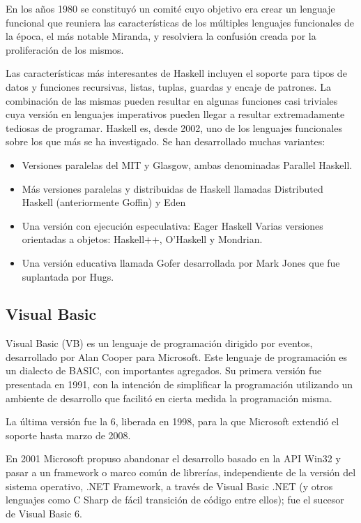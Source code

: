 \documentclass[twoside,twocolumn]{article}
\begin{document}
En los años 1980 se constituyó un comité cuyo objetivo era crear un lenguaje funcional que reuniera las características de los múltiples lenguajes funcionales de la época, el más notable Miranda, y resolviera la confusión creada por la proliferación de los mismos.

Las características más interesantes de Haskell incluyen el soporte para tipos de datos y funciones recursivas, listas, tuplas, guardas y encaje de patrones. La combinación de las mismas pueden resultar en algunas funciones casi triviales cuya versión en lenguajes imperativos pueden llegar a resultar extremadamente tediosas de programar. Haskell es, desde 2002, uno de los lenguajes funcionales sobre los que más se ha investigado. Se han desarrollado muchas variantes:
\begin{itemize}

\item Versiones paralelas del MIT y Glasgow, ambas denominadas Parallel Haskell.
\item Más versiones paralelas y distribuidas de Haskell llamadas Distributed Haskell (anteriormente Goffin) y Eden
\item   Una versión con ejecución especulativa: Eager Haskell
    Varias versiones orientadas a objetos: Haskell++, O'Haskell y Mondrian.
\item Una versión educativa llamada Gofer desarrollada por Mark Jones que fue suplantada por Hugs.
    
\end{itemize}

\subsection{Visual Basic}

Visual Basic (VB) es un lenguaje de programación dirigido por eventos, desarrollado por Alan Cooper para Microsoft. Este lenguaje de programación es un dialecto de BASIC, con importantes agregados. Su primera versión fue presentada en 1991, con la intención de simplificar la programación utilizando un ambiente de desarrollo que facilitó en cierta medida la programación misma.

La última versión fue la 6, liberada en 1998, para la que Microsoft extendió el soporte hasta marzo de 2008.

En 2001 Microsoft propuso abandonar el desarrollo basado en la API Win32 y pasar a un framework o marco común de librerías, independiente de la versión del sistema operativo, .NET Framework, a través de Visual Basic .NET (y otros lenguajes como C Sharp de fácil transición de código entre ellos); fue el sucesor de Visual Basic 6.
\end{document}
